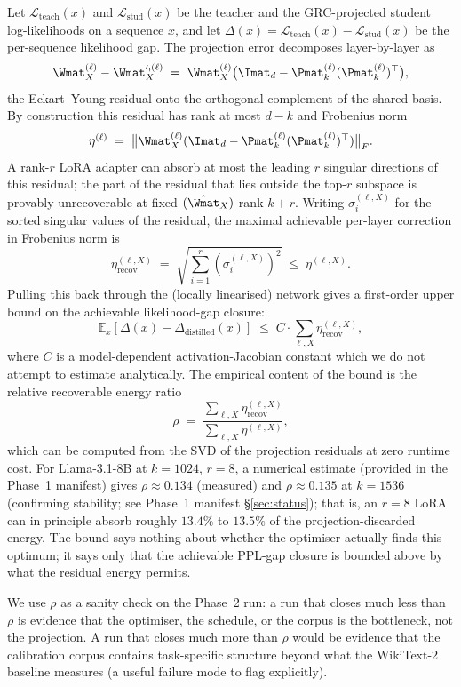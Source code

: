 \documentclass[11pt]{article}
\begin{document}
Let $\mathcal{L}_{\text{teach}}(x)$ and $\mathcal{L}_{\text{stud}}(x)$
be the teacher and the GRC-projected student log-likelihoods on a
sequence $x$, and let $\Delta(x) = \mathcal{L}_{\text{teach}}(x) -
\mathcal{L}_{\text{stud}}(x)$ be the per-sequence likelihood gap. The
projection error decomposes layer-by-layer as
\[
\Wmat_X^{(\ell)} - \Wmat_X^{\prime,(\ell)}
\;=\; \Wmat_X^{(\ell)} \big(\Imat_d - \Pmat_k^{(\ell)} (\Pmat_k^{(\ell)})^\top\big),
\]
the Eckart--Young residual onto the orthogonal complement of the
shared basis. By construction this residual has rank at most
$d - k$ and Frobenius norm
\[
\eta^{(\ell)} \;=\; \big\|\Wmat_X^{(\ell)}(\Imat_d - \Pmat_k^{(\ell)}(\Pmat_k^{(\ell)})^\top)\big\|_F.
\]
A rank-$r$ LoRA adapter can absorb at most the leading $r$ singular
directions of this residual; the part of the residual that lies outside
the top-$r$ subspace is provably unrecoverable at fixed
$(\hat{\Wmat}_X)$ rank $k+r$. Writing $\sigma_i^{(\ell,X)}$ for the
sorted singular values of the residual, the maximal achievable per-layer
correction in Frobenius norm is
\[
\eta_{\text{recov}}^{(\ell,X)} \;=\; \sqrt{\sum_{i=1}^{r} (\sigma_i^{(\ell,X)})^2}
\;\le\; \eta^{(\ell,X)}.
\]
Pulling this back through the (locally linearised) network gives a
first-order upper bound on the achievable likelihood-gap closure:
\[
\mathbb{E}_x[\Delta(x) - \Delta_{\text{distilled}}(x)]
\;\le\; C \cdot \sum_{\ell,X} \eta_{\text{recov}}^{(\ell,X)},
\]
where $C$ is a model-dependent activation-Jacobian constant which we
do not attempt to estimate analytically. The empirical content of the
bound is the relative recoverable energy ratio
\[
\rho \;=\; \frac{\sum_{\ell,X} \eta_{\text{recov}}^{(\ell,X)}}{\sum_{\ell,X} \eta^{(\ell,X)}},
\]
which can be computed from the SVD of the projection residuals at zero
runtime cost. For Llama-3.1-8B at $k{=}1024$, $r{=}8$, a numerical
estimate (provided in the Phase~1 manifest) gives $\rho \approx 0.134$
(measured) and $\rho \approx 0.135$ at $k{=}1536$ (confirming stability;
see Phase~1 manifest \S\ref{sec:status}); that is, an $r{=}8$ LoRA can
in principle absorb roughly $13.4\%$ to $13.5\%$ of the
projection-discarded energy. The bound says nothing about whether the
optimiser actually finds this optimum; it says only that the achievable
PPL-gap closure is bounded above by what the residual energy permits.

We use $\rho$ as a sanity check on the Phase~2 run: a run that closes
much less than $\rho$ is evidence that the optimiser, the schedule, or
the corpus is the bottleneck, not the projection. A run that closes
much more than $\rho$ would be evidence that the calibration corpus
contains task-specific structure beyond what the WikiText-2 baseline
measures (a useful failure mode to flag explicitly).
\end{document}

